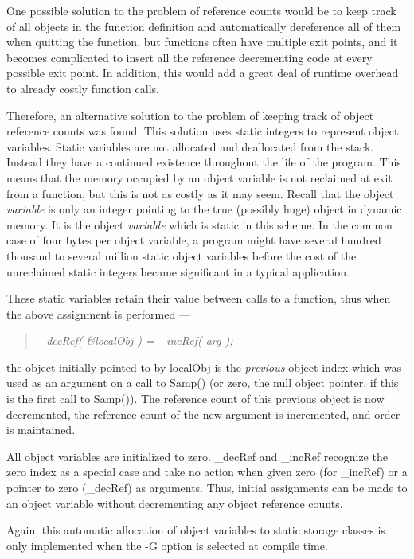 One possible solution to the problem of reference counts would
be to keep track of all objects
in the function definition and automatically dereference all of them
when quitting the function, but functions often have multiple
exit points, and it becomes complicated to insert all the reference
decrementing code at every possible exit point.
In addition, this would add a great deal of runtime overhead to
already costly function calls.

Therefore, an alternative solution to the problem of keeping track of
object reference counts was found.  This solution uses static integers to
represent object variables.  Static variables are not allocated and
deallocated from the stack.  Instead they have a continued existence
throughout the life of the program.  This means that the memory occupied
by an object variable is not reclaimed at exit from a function, but this
is not as costly as it may seem.  Recall that the object {\em variable} is
only an integer pointing to the true (possibly huge) object in dynamic
memory.  It is the object {\em variable} which is static in this scheme.
In the common case of four bytes per object variable, a program might have
several hundred thousand to several million static object variables before
the cost of the unreclaimed static integers became significant in a
typical application.

These static variables retain their value between calls to a function,
thus when the above assignment is performed ---
\begin{quote}\em *\_decRef( \&localObj ) = \_incRef( arg );\end{quote}
the object initially pointed to by localObj is the {\em previous}
object index which was used as an argument on a call to Samp() (or zero, the
null object pointer, if this is the first call to Samp()).  The reference
count of this previous object is now decremented, the reference count of
the new argument is incremented, and order is maintained.

All object variables are initialized to zero.  \_decRef and \_incRef
recognize the zero index as a special case and take no action when
given zero (for \_incRef) or a pointer to zero (\_decRef) as arguments.
Thus, initial assignments can be made to an object variable without
decrementing any object reference counts.

Again, this automatic allocation of object variables to static storage
classes is
only implemented when the -G option is selected at compile time.

